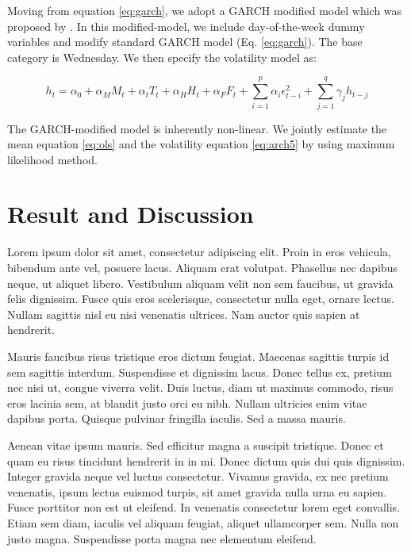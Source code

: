 \documentclass[12pt]{article}
\begin{document}
 Moving from equation \eqref{eq:garch}, we adopt  a GARCH modified model which was proposed by \cite{Berument2001}. In this modified-model,  we include day-of-the-week dummy variables and modify standard GARCH model (Eq. \ref{eq:garch}). The base category is Wednesday. We then specify the volatility model as:
  
  \begin{equation}\label{eq:arch5}
 h_t= \alpha_0+\alpha_M M_t +\alpha_t T_t +\alpha_H H_t + \alpha_F F_t+  \sum_{i=1}^{p}\alpha_i \epsilon_{t-i}^2+\sum_{j=1}^q\gamma_j h_{t-j}
 \end{equation}
 
 The GARCH-modified model is inherently non-linear. We jointly estimate the mean equation \eqref{eq:ols} and the volatility equation \eqref{eq:arch5} by using maximum likelihood method.
 
\section*{Result and Discussion}
\label{sec:subsec}
\setlength\extrarowheight{-7pt}


Lorem ipsum dolor sit amet, consectetur adipiscing elit. Proin in eros vehicula, bibendum ante vel, posuere lacus. Aliquam erat volutpat. Phasellus nec dapibus neque, ut aliquet libero. Vestibulum aliquam velit non sem faucibus, ut gravida felis dignissim. Fusce quis eros scelerisque, consectetur nulla eget, ornare lectus. Nullam sagittis nisl eu nisi venenatis ultrices. Nam auctor quis sapien at hendrerit.

Mauris faucibus risus tristique eros dictum feugiat. Maecenas sagittis turpis id sem sagittis interdum. Suspendisse et dignissim lacus. Donec tellus ex, pretium nec nisi ut, congue viverra velit. Duis luctus, diam ut maximus commodo, risus eros lacinia sem, at blandit justo orci eu nibh. Nullam ultricies enim vitae dapibus porta. Quisque pulvinar fringilla iaculis. Sed a massa mauris.

Aenean vitae ipsum mauris. Sed efficitur magna a suscipit tristique. Donec et quam eu risus tincidunt hendrerit in in mi. Donec dictum quis dui quis dignissim. Integer gravida neque vel luctus consectetur. Vivamus gravida, ex nec pretium venenatis, ipsum lectus euismod turpis, sit amet gravida nulla urna eu sapien. Fusce porttitor non est ut eleifend. In venenatis consectetur lorem eget convallis. Etiam sem diam, iaculis vel aliquam feugiat, aliquet ullamcorper sem. Nulla non justo magna. Suspendisse porta magna nec elementum eleifend.
\end{document}
